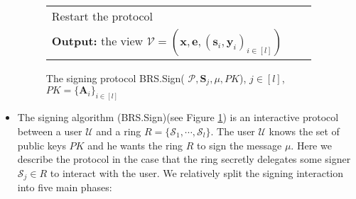 \documentclass[runningheads]{llncs}
\begin{document}
\begin{itemize}
\begin{figure}[pt]
\begin{tabular}{|  l c l | }
			\hspace{1.5cm} Restart the protocol&&\\
			\textbf{Output:} the view $\mathcal{V}=(\mathbf{x},\mathbf{e}, (\mathbf{s}_i, \mathbf{y}_i)_{i \in [l]})$&& \\
			\hline
		\end{tabular}
		
		\medskip
		\caption{The signing protocol \textsf{BRS.Sign}( $\mathcal{P}, \mathbf{S}_j,\mu, PK $), $j \in [l]$, $PK=\{\mathbf{A}_i\}_{i\in[l]}$} 
		\label{fig1}
	\end{figure}
	
	
	
	\item The signing algorithm (\textsf{BRS.Sign})(see Figure \ref{fig1}) is an interactive protocol between a user $\mathcal{U}$ and a ring $R=\{\mathcal{S}_1,\cdots, \mathcal{S}_l\}$. The user $\mathcal{U}$ knows the set of public keys $PK$ and he wants the ring $R$ to sign  the message $\mu$. Here we describe the protocol in the case that the ring secretly delegates some signer $\mathcal{S}_j \in R$ to interact with the user. We relatively split the  signing interaction into five main phases:
	

\end{itemize}
\end{document}
